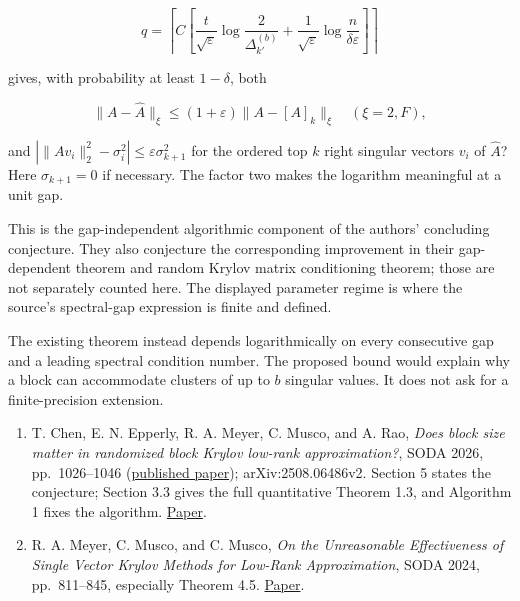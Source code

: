 \documentclass[11pt,a4paper]{article}
\makeatletter
\providecommand{\tightlist}{\setlength{\itemsep}{0pt}\setlength{\parskip}{0pt}}
\renewcommand{\subsection}{\Needspace{4\baselineskip}\@startsection{subsection}{2}{0pt}{9pt plus 1pt minus 1pt}{3pt}{\sffamily\bfseries\normalsize\color{ink}}}
\makeatother
\begin{document}
\[q=\left\lceil C\left[
\frac{t}{\sqrt\varepsilon}\log\frac{2}{\Delta_{k'}^{(b)}}+
\frac1{\sqrt\varepsilon}\log\frac{n}{\delta\varepsilon}
\right]\right\rceil\]

gives, with probability at least \(1-\delta\), both

\[\|A-\widehat A\|_\xi\leq(1+\varepsilon)\|A-[A]_k\|_\xi
\quad(\xi=2,F),\]

and \(|\|A v_i\|_2^2-\sigma_i^2|\leq\varepsilon\sigma_{k+1}^2\) for the
ordered top \(k\) right singular vectors \(v_i\) of \(\widehat A\)? Here
\(\sigma_{k+1}=0\) if necessary. The factor two makes the logarithm
meaningful at a unit gap.

This is the gap-independent algorithmic component of the authors'
concluding conjecture. They also conjecture the corresponding
improvement in their gap-dependent theorem and random Krylov matrix
conditioning theorem; those are not separately counted here. The
displayed parameter regime is where the source's spectral-gap expression
is finite and defined.

The existing theorem instead depends logarithmically on every
consecutive gap and a leading spectral condition number. The proposed
bound would explain why a block can accommodate clusters of up to \(b\)
singular values. It does not ask for a finite-precision extension.

\subsection{References}\label{references}

\begin{enumerate}
\def\labelenumi{\arabic{enumi}.}
\tightlist
\item
  T. Chen, E. N. Epperly, R. A. Meyer, C. Musco, and A. Rao, \emph{Does
  block size matter in randomized block Krylov low-rank approximation?},
  SODA 2026, pp.~1026--1046
  (\href{https://doi.org/10.1137/1.9781611978971.42}{published paper});
  arXiv:2508.06486v2. Section 5 states the conjecture; Section 3.3 gives
  the full quantitative Theorem 1.3, and Algorithm 1 fixes the
  algorithm. \href{https://arxiv.org/html/2508.06486v2}{Paper}.
\item
  R. A. Meyer, C. Musco, and C. Musco, \emph{On the Unreasonable
  Effectiveness of Single Vector Krylov Methods for Low-Rank
  Approximation}, SODA 2024, pp.~811--845, especially Theorem 4.5.
  \href{https://arxiv.org/abs/2305.02535}{Paper}.
\end{enumerate}
\end{document}
